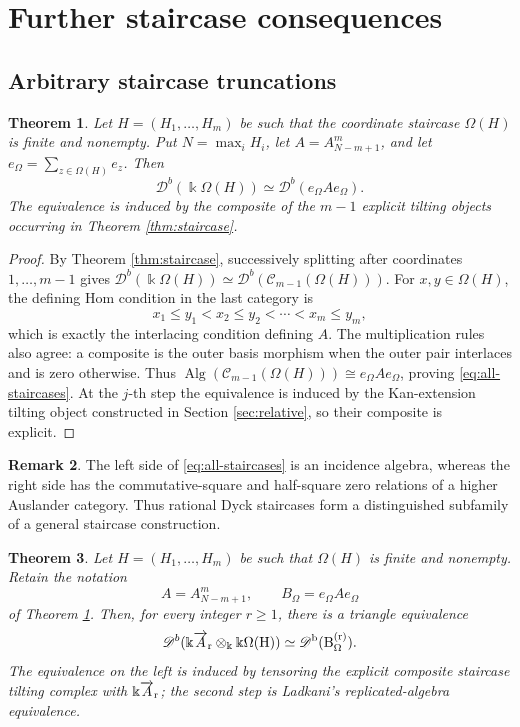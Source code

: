\documentclass[12pt,a4paper,english,reqno]{amsart}
\theoremstyle{plain}
\newtheorem{theorem}{Theorem}[section]
\theoremstyle{definition}
\newtheorem{remark}[theorem]{Remark}
\newcommand{\kk}{\Bbbk}
\newcommand{\C}{\mathcal C}
\newcommand{\Db}[1]{{\mathscr D}^b(#1)}
\newcommand{\ovr}{\rm \overrightarrow}
\begin{document}
\section{Further staircase consequences}
\label{sec:staircase-consequences}

\subsection{Arbitrary staircase truncations}

\begin{theorem}
\label{thm:arbitrary-staircase-application}
Let $H=(H_1,\ldots,H_m)$ be such that the coordinate staircase
$\Omega(H)$ is finite and nonempty.  Put $N=\max_i H_i$, let
$A=A_{N-m+1}^{m}$, and let
$e_\Omega=\sum_{z\in\Omega(H)}e_z$.  Then
\begin{equation}
 \Db{\kk\Omega(H)}
 \simeq\Db{e_{\Omega}Ae_{\Omega}}.
\label{eq:all-staircases}
\end{equation}
The equivalence is induced by the composite of the $m-1$ explicit tilting
objects occurring in Theorem \ref{thm:staircase}.
\end{theorem}

\begin{proof}
By Theorem \ref{thm:staircase}, successively splitting after coordinates
$1,\ldots,m-1$ gives $\Db{\kk\Omega(H)}
 \simeq\Db{\C_{m-1}(\Omega(H))}$.
For $x,y\in\Omega(H)$, the defining Hom condition in the last category is
\[
 x_1\leq y_1<x_2\leq y_2<\cdots<x_m\leq y_m,
\]
which is exactly the interlacing condition defining $A$.  The
multiplication rules also agree: a composite is the outer basis morphism
when the outer pair interlaces and is zero otherwise.  Thus
$\operatorname{Alg}(\C_{m-1}(\Omega(H)))\cong e_\Omega Ae_\Omega$, proving
\eqref{eq:all-staircases}.  At the $j$-th step the equivalence is induced
by the Kan-extension tilting object constructed in Section \ref{sec:relative}, so
their composite is explicit.
\end{proof}

\begin{remark}
The left side of \eqref{eq:all-staircases} is an incidence algebra, whereas
the right side has the commutative-square and half-square zero relations of
a higher Auslander category.  Thus rational Dyck staircases form a
distinguished subfamily of a general staircase construction.
\end{remark}

\begin{theorem}
\label{thm:replicated-staircase}
Let $H=(H_1,\ldots,H_m)$ be such that $\Omega(H)$ is finite and
nonempty.  Retain the notation
\[
 A=A_{N-m+1}^{m},
 \qquad
 B_\Omega=e_\Omega Ae_\Omega
\]
of Theorem \ref{thm:arbitrary-staircase-application}.  Then, for every integer
$r\geq1$, there is a triangle equivalence
\begin{equation}
 \Db{\kk\ovr A_r\otimes_{\kk}\kk\Omega(H)}
 \simeq
 \Db{B_\Omega^{(r)}}.
\label{eq:replicated-staircase}
\end{equation}
The equivalence on the left is induced by tensoring the explicit composite
staircase tilting complex with $\kk\ovr A_r$; the second step is
Ladkani's replicated-algebra equivalence.
\end{theorem}
\end{document}
